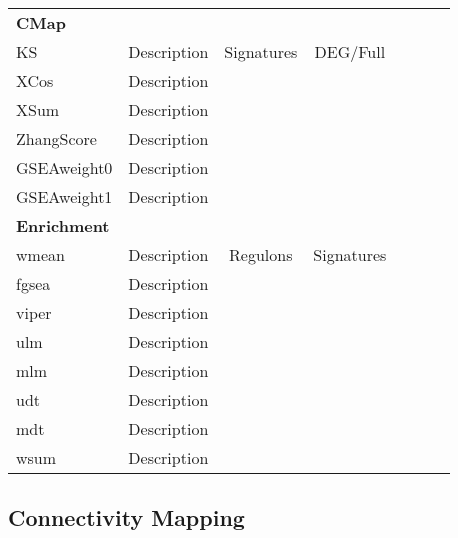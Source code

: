 \begin{xltabular}{\textwidth}{Xcccccc}
\midrule
\textbf{CMap} \\
KS             & Description & Signatures   & DEG/Full     & ~\cite{RN79} \\
XCos           & Description &              &              & ~\cite{RN79} \\
XSum           & Description &              &              & ~\cite{RN79} \\
ZhangScore     & Description &              &              & ~\cite{RN79} \\
GSEAweight0    & Description &              &              & ~\cite{RN79} \\
GSEAweight1    & Description &              &              & ~\cite{RN79} \\
\midrule
\textbf{Enrichment} \\
wmean   & Description  & Regulons     & Signatures  & ~\cite{RN36} \\
fgsea   & Description  &              &             & ~\cite{RN35} \\
viper   & Description  &              &             & ~\cite{RN35} \\
ulm     & Description  &              &             & ~\cite{RN36} \\
mlm     & Description  &              &             & ~\cite{RN36} \\
udt     & Description  &              &             & ~\cite{RN36} \\
mdt     & Description  &              &             & ~\cite{RN36} \\
wsum    & Description  &              &             & ~\cite{RN35} \\
\bottomrule
\end{xltabular}
\egroup



\subsection{Connectivity Mapping} %
\label{sub:connectivity_mapping}

